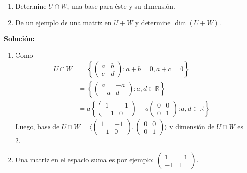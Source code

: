 \documentclass[a4paper]{article}
\theoremstyle{exampstyle}
\theoremstyle{definition}
\begin{document}
\begin{enumerate}
\begin{enumerate}
\item Determine $U \cap W$, una base para \'este y su dimensión.
\item De un ejemplo de una matriz en $U+W$ y determine $\dim(U+W)$.
\end{enumerate}
\textbf{Soluci\'on:}
\begin{enumerate}
    \item Como
    \begin{align*}
        U \cap W&=\left\{\begin{pmatrix} a & b \\ c & d \end{pmatrix}\colon a+b=0, a+c=0\right\}\\&=\left\{\begin{pmatrix} a & -a \\ -a & d \end{pmatrix}\colon a,d\in \mathbb{R}\right\}\\
        &=a\left\{\begin{pmatrix} 1 & -1 \\ -1 & 0 \end{pmatrix}+d\begin{pmatrix} 0 & 0 \\ 0 & 1 \end{pmatrix}\colon a,d\in \mathbb{R}\right\}
    \end{align*}
Luego, base de $U\cap W=\langle\begin{pmatrix} 1 & -1 \\ -1 & 0 \end{pmatrix},\begin{pmatrix} 0 & 0 \\ 0 & 1 \end{pmatrix}\rangle$ y dimensi\'on de $U\cap W$ es 2.
\item Una matriz en el espacio suma es por ejemplo: $\begin{pmatrix} 1 & -1 \\ -1 & 1 \end{pmatrix}$.


\end{enumerate}
\end{enumerate}
\end{document}
